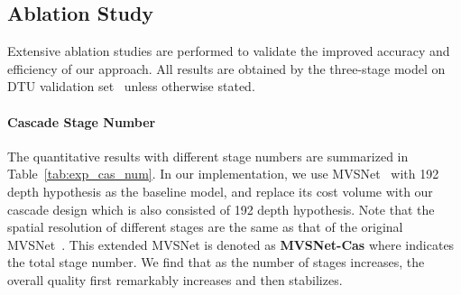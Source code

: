 \documentclass[10pt,twocolumn,letterpaper]{article}
\begin{document}
\begin{table}[t]
\begin{center}
\footnotesize
{}
\end{center} 
\vspace{-5mm}
\caption{The quantitative comparison between MVSNet and MVSNet with different settings of the cascade cost volumes. Specifically, "cascade" denotes that the original cost volume is divided into three cascade cost volumes, "upsample" denotes cost volumes with increased spatial resolutions by bilinear upsampling corresponding feature maps, and “feature pyramid” denotes cost volumes with higher spatial resolutions built on pyramid feature maps. The statistics are evaluated on the DTU dataset.}
\vspace{-4mm}
\label{tab:exp_cas_spatial}
\end{table}




\subsection{Ablation Study} 
Extensive ablation studies are performed to validate the improved accuracy and efficiency of our approach.
All results are obtained by the three-stage model on DTU validation set~\cite{aanaes2016dtu} unless otherwise stated.

\paragraph{Cascade Stage Number}\vspace{-4mm}
The quantitative results with different stage numbers are summarized in Table~\ref{tab:exp_cas_num}. In our implementation, we use MVSNet~\cite{yao2018mvsnet} with 192 depth hypothesis as the baseline model, and replace its cost volume with our cascade design which is also consisted of 192 depth hypothesis.
Note that the spatial resolution of different stages are the same as that of the original MVSNet~\cite{yao2018mvsnet}.
This extended MVSNet is denoted as \textbf{MVSNet-Cas} where  indicates the total stage number.
We find that as the number of stages increases, the overall quality first remarkably increases and then stabilizes.
\end{document}
